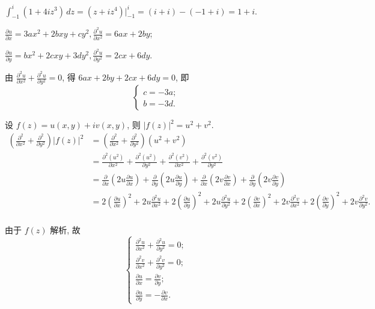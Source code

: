 \documentclass{homework}
\begin{document}
\maketitle

\begin{center}
\end{center}

\(\int_{-1}^{i}(1+4iz^3)\,dz=(z+iz^4)|_{-1}^{i}=(i+i)-(-1+i)=1+i\).

\(\frac{\partial u}{\partial x}=3ax^2+2bxy+cy^2, \frac{\partial^2 u}{\partial x^2}=6ax+2by\);

\(\frac{\partial u}{\partial y}=bx^2+2cxy+3dy^2, \frac{\partial^2 u}{\partial y^2}=2cx+6dy\).

由 \(\frac{\partial^2 u}{\partial x^2}+\frac{\partial^2 u}{\partial y^2}=0\), 得 \(6ax+2by+2cx+6dy=0\), 即
\[\begin{cases}
  c=-3a;\\
  b=-3d.
\end{cases}\]

设 \(f(z)=u(x, y)+iv(x, y)\), 则 \(|f(z)|^2=u^2+v^2\).
\begin{align*}
  \left(\frac{\partial^2}{\partial x^2}+\frac{\partial^2}{\partial y^2}\right)|f(z)|^2&=\left(\frac{\partial^2}{\partial x^2}+\frac{\partial^2}{\partial y^2}\right)(u^2+v^2)\\
  &=\frac{\partial^2(u^2)}{\partial x^2}+\frac{\partial^2(u^2)}{\partial y^2}+\frac{\partial^2(v^2)}{\partial x^2}+\frac{\partial^2(v^2)}{\partial y^2}\\
  &=\frac{\partial}{\partial x}\left(2u\frac{\partial u}{\partial x}\right)+\frac{\partial}{\partial y}\left(2u\frac{\partial u}{\partial y}\right)+\frac{\partial}{\partial x}\left(2v\frac{\partial v}{\partial x}\right)+\frac{\partial}{\partial y}\left(2v\frac{\partial v}{\partial y}\right)\\
  &=2\left(\frac{\partial u}{\partial x}\right)^2+2u\frac{\partial^2 u}{\partial x^2}+2\left(\frac{\partial u}{\partial y}\right)^2+2u\frac{\partial^2 u}{\partial y^2}+2\left(\frac{\partial v}{\partial x}\right)^2+2v\frac{\partial^2 v}{\partial x^2}+2\left(\frac{\partial v}{\partial y}\right)^2+2v\frac{\partial^2 v}{\partial y^2}.\\
\end{align*}

由于 \(f(z)\) 解析, 故
\[\begin{cases}
  \frac{\partial^2 u}{\partial x^2}+\frac{\partial^2 u}{\partial y^2}=0;\\
  \frac{\partial^2 v}{\partial x^2}+\frac{\partial^2 v}{\partial y^2}=0;\\
  \frac{\partial u}{\partial x}=\frac{\partial v}{\partial y};\\
  \frac{\partial u}{\partial y}=-\frac{\partial v}{\partial x}.
\end{cases}\]
\end{document}
